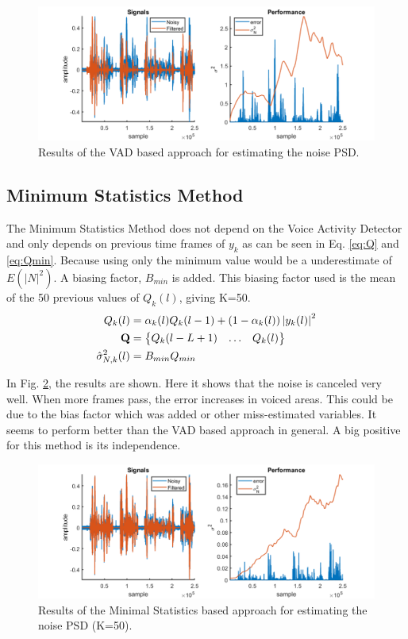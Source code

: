 \begin{figure}[h]
  \centering
  \includegraphics[width=\textwidth]{images/noisepsd.png}
  \caption{Results of the VAD based approach for estimating the noise PSD.}
  \label{fig:VADnoise}
\end{figure}

\clearpage

\subsection{Minimum Statistics Method}
The Minimum Statistics Method does not depend on the Voice Activity Detector and only depends on previous time frames of $y_{k}$ as can be seen in Eq. \ref{eq:Q} and \ref{eq:Qmin}. Because using only the minimum value would be a underestimate of $E(|N|^2)$. A biasing factor, $B_{min}$ is added. This biasing factor used is the mean of the 50 previous values of $Q_k(l)$, giving K=50.
\begin{align}
Q_{k}(l) &= \alpha_k(l)Q_k(l-1)+(1-\alpha_k(l))\abs{y_{k}(l)}^{2}\label{eq:Qk} \\
  \mathbf{Q} &=
  \begin{Bmatrix}
    Q_{k}(l-L+1) & \hdots & Q_{k}(l)
  \end{Bmatrix}
  \label{eq:Q} \\
  \hat \sigma_{N,k}^{2}(l) &= B_{min}Q_{min}
  \label{eq:Qmin}\\
\end{align}

In Fig. \ref{fig:minstatnoise}, the results are shown. Here it shows that the noise is canceled very well. When more frames pass, the error increases in voiced areas. This could be due to the bias factor which was added or other miss-estimated variables. It seems to perform better than the VAD based approach in general. A big positive for this method is its independence.

\begin{figure}[h]
  \centering
  \includegraphics[width=\textwidth]{images/msmethod.png}
  \caption{Results of the Minimal Statistics based approach for estimating the noise PSD (K=50).}
  \label{fig:minstatnoise}
\end{figure}

